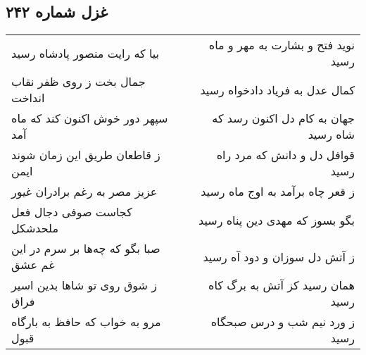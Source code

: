 \begin{center}
\section*{غزل شماره ۲۴۲}
\label{sec:sh242}
\begin{longtable}{l p{0.5cm} r}
بیا که رایت منصور پادشاه رسید
&&
نوید فتح و بشارت به مهر و ماه رسید
\\
جمال بخت ز روی ظفر نقاب انداخت
&&
کمال عدل به فریاد دادخواه رسید
\\
سپهر دور خوش اکنون کند که ماه آمد
&&
جهان به کام دل اکنون رسد که شاه رسید
\\
ز قاطعان طریق این زمان شوند ایمن
&&
قوافل دل و دانش که مرد راه رسید
\\
عزیز مصر به رغم برادران غیور
&&
ز قعر چاه برآمد به اوج ماه رسید
\\
کجاست صوفی دجال فعل ملحدشکل
&&
بگو بسوز که مهدی دین پناه رسید
\\
صبا بگو که چه‌ها بر سرم در این غم عشق
&&
ز آتش دل سوزان و دود آه رسید
\\
ز شوق روی تو شاها بدین اسیر فراق
&&
همان رسید کز آتش به برگ کاه رسید
\\
مرو به خواب که حافظ به بارگاه قبول
&&
ز ورد نیم شب و درس صبحگاه رسید
\\
\end{longtable}
\end{center}
